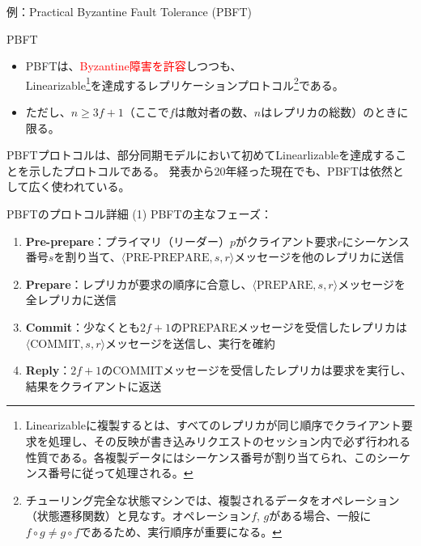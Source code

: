 \documentclass[aspectratio=169,10pt]{beamer}
\newenvironment{proofblock}[1][]
{\begin{block}{#1}\vspace{0.5em}}
{\vspace{0.5em}\end{block}}
\begin{document}
\begin{frame}{例：Practical Byzantine Fault Tolerance (PBFT)}
\begin{proofblock}[PBFT]
\begin{itemize}
    \item PBFTは、\textcolor{red}{Byzantine障害を許容}しつつも、\\Linearizable\footnote{Linearizableに複製するとは、すべてのレプリカが同じ順序でクライアント要求を処理し、その反映が書き込みリクエストのセッション内で必ず行われる性質である。各複製データにはシーケンス番号が割り当てられ、このシーケンス番号に従って処理される。}を達成するレプリケーションプロトコル\footnote{チューリング完全な状態マシンでは、複製されるデータをオペレーション（状態遷移関数）と見なす。オペレーション$f$, $g$がある場合、一般に$f \circ g \neq g \circ f$であるため、実行順序が重要になる。}である。
    \item ただし、$n \geq 3f+1$（ここで$f$は敵対者の数、$n$はレプリカの総数）のときに限る。
\end{itemize}
\end{proofblock}

PBFTプロトコルは、部分同期モデルにおいて初めてLinearlizableを達成することを示したプロトコルである。
発表から20年経った現在でも、PBFTは依然として広く使われている。


\end{frame}

\begin{frame}{PBFTのプロトコル詳細 (1)}
PBFTの主なフェーズ：
\vspace{0.5em}
\begin{enumerate}
    \item \textbf{Pre-prepare}：プライマリ（リーダー）$p$がクライアント要求$r$にシーケンス番号$s$を割り当て、$\langle \text{PRE-PREPARE}, s, r \rangle$メッセージを他のレプリカに送信
    
    \item \textbf{Prepare}：レプリカが要求の順序に合意し、$\langle \text{PREPARE}, s, r \rangle$メッセージを全レプリカに送信
    
    \item \textbf{Commit}：少なくとも$2f+1$のPREPAREメッセージを受信したレプリカは$\langle \text{COMMIT}, s, r \rangle$メッセージを送信し、実行を確約
    
    \item \textbf{Reply}：$2f+1$のCOMMITメッセージを受信したレプリカは要求を実行し、結果をクライアントに返送
\end{enumerate}
\end{frame}
\end{document}
